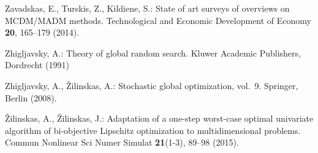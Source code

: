 \documentclass{svproc}
\begin{document}
\begin{thebibliography}{10}
Zavadskas, E., Turskis, Z., Kildiene, S.: State of art surveys of overviews on
  {MCDM}/{MADM} methods.
\newblock Technological and Economic Development of Economy \textbf{20},
  165--179 (2014).
\newblock {}

Zhigljavsky, A.: Theory of global random search.
\newblock Kluwer Academic Publishers, Dordrecht (1991)

Zhigljavsky, A., {\v Z}ilinskas, A.: Stochastic global optimization, vol.~9.
\newblock Springer, Berlin (2008).
\newblock {}

{\v Z}ilinskas, A., {\v Z}ilinskas, J.: Adaptation of a one-step worst-case
  optimal univariate algorithm of bi-objective {Lipschitz} optimization to
  multidimensional problems.
\newblock Commun Nonlinear Sci Numer Simulat \textbf{21}(1-3), 89--98 (2015).
\newblock {}

\end{thebibliography}
\end{document}
